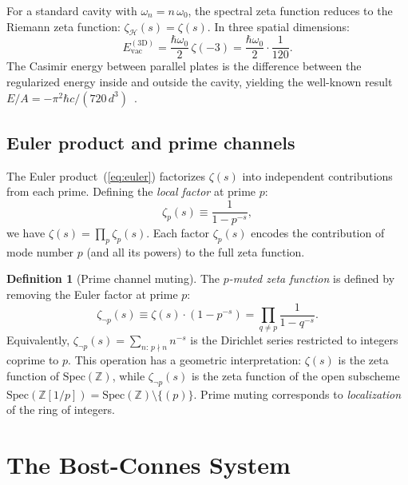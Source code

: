 \documentclass[aps,prd,twocolumn,superscriptaddress,nofootinbib]{revtex4-2}
\newcommand{\Spec}{\mathrm{Spec}}
\newcommand{\Zp}{\mathbb{Z}[1/p]}
\begin{document}
For a standard cavity with $\omega_n = n\,\omega_0$, the spectral
zeta function reduces to the Riemann zeta function:
$\zeta_{\mathcal{H}}(s) = \zeta(s)$.
In three spatial dimensions:
\begin{equation}
  E_{\mathrm{vac}}^{\mathrm{(3D)}} = \frac{\hbar\omega_0}{2}\,\zeta(-3) = \frac{\hbar\omega_0}{2} \cdot \frac{1}{120}.
  \label{eq:vac_3d}
\end{equation}
The Casimir energy between parallel plates is the difference between
the regularized energy inside and outside the cavity, yielding the
well-known result $E/A = -\pi^2\hbar c / (720\,d^3)$~\cite{Casimir1948}.

\subsection{Euler product and prime channels}

The Euler product~(\ref{eq:euler}) factorizes $\zeta(s)$ into
independent contributions from each prime.
Defining the \emph{local factor} at prime $p$:
\begin{equation}
  \zeta_p(s) \equiv \frac{1}{1 - p^{-s}},
\end{equation}
we have $\zeta(s) = \prod_p \zeta_p(s)$.
Each factor $\zeta_p(s)$ encodes the contribution of mode number $p$
(and all its powers) to the full zeta function.

\noindent\textbf{Definition 1} (Prime channel muting).
\label{def:muting}
The \emph{$p$-muted zeta function} is defined by removing the
Euler factor at prime $p$:
\begin{equation}
  \zeta_{\neg p}(s) \equiv \zeta(s) \cdot (1 - p^{-s})
  = \prod_{q \neq p} \frac{1}{1 - q^{-s}}.
  \label{eq:muted_zeta}
\end{equation}
Equivalently, $\zeta_{\neg p}(s) = \sum_{n:\, p \nmid n} n^{-s}$
is the Dirichlet series restricted to integers coprime to $p$.
This operation has a geometric interpretation:
$\zeta(s)$ is the zeta function of $\Spec(\mathbb{Z})$,
while $\zeta_{\neg p}(s)$ is the zeta function of the
open subscheme $\Spec(\Zp) = \Spec(\mathbb{Z}) \setminus \{(p)\}$.
Prime muting corresponds to \emph{localization} of the ring of integers.

\section{The Bost-Connes System}
\label{sec:bc}
\end{document}
